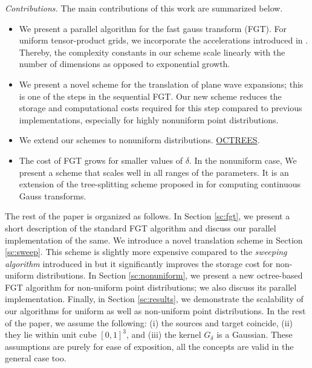 {\em Contributions.} The main contributions of this work are summarized below.
\begin{itemize} 
%
\item We present a parallel algorithm for the fast gauss transform (FGT). For uniform tensor-product grids, we incorporate the accelerations introduced in \cite{fggt}. Thereby, the complexity constants in our scheme scale linearly with the number of dimensions as opposed to exponential growth. 
%
\item We present a novel scheme for the translation of plane wave expansions; this is one of the steps in the sequential FGT. Our new scheme reduces the storage and computational costs required for this step compared to previous implementations, especially for highly nonuniform point distributions.
%
\item We extend our schemes to nonuniform distributions. \ul{OCTREES}.

\item The cost of FGT grows for smaller values of $\delta$. In the nonuniform case, 
We present a scheme that scales well in all ranges of the parameters. It is an extension of the tree-splitting scheme 
proposed in \cite{veerapaneni08} for computing continuous Gauss transforms. 
%
\end{itemize}

The rest of the paper is organized as follows. In Section \ref{sc:fgt}, we present a short description of the standard FGT algorithm and discuss our parallel implementation of the same. We introduce a novel translation scheme in Section \ref{sc:sweep}. This scheme is slightly more expensive compared to the {\em sweeping algorithm} introduced in \cite{greengard98} but it significantly improves the storage cost for non-uniform distributions. In Section 
\ref{sc:nonuniform}, we present a new octree-based FGT algorithm for non-uniform point distributions; we also discuss its parallel implementation. Finally, in Section \ref{sc:results}, we demonstrate the scalability of our algorithms for uniform as well as non-uniform point distributions. In the rest of the paper, we assume the following: (i) the sources and target coincide, (ii) they lie within unit cube $[0, 1]^3$, and (iii) the kernel $G_\delta$ is a Gaussian. These assumptions are purely for ease of exposition, all the concepts are valid in the general case too. 